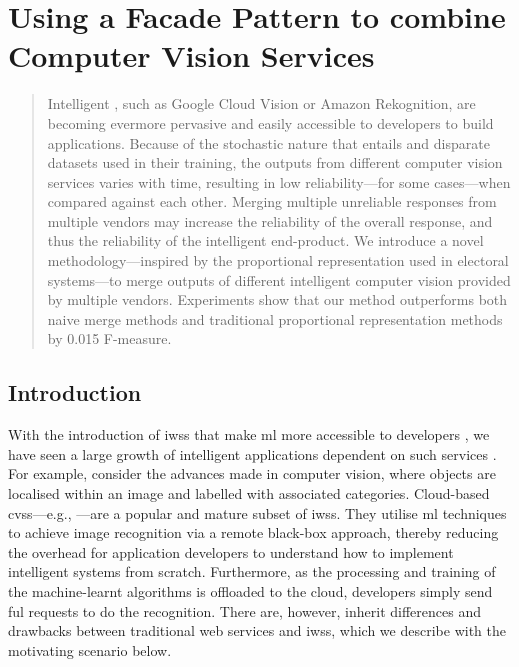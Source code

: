 \chapter[Using a Facade Pattern to combine Computer Vision Services]
{Using a Facade Pattern to combine Computer Vision Services}
\label{ch:icwe2019}
\graphicspath{{mainmatter/publications/figures/icwe2019/}}

\glsresetall
\begin{abstract}
Intelligent , such as Google Cloud Vision or Amazon Rekognition, are becoming evermore pervasive and easily accessible to developers to build applications.
Because of the stochastic nature that  entails and disparate datasets used in their training, the outputs from different computer vision services varies with time, resulting in low reliability---for some cases---when compared against each other.
Merging multiple unreliable  responses from multiple vendors may increase the reliability of the overall response, and thus the reliability of the intelligent end-product.
We introduce a novel methodology---inspired by the proportional representation used in electoral systems---to merge outputs of different intelligent computer vision  provided by multiple vendors.
Experiments show that our method outperforms both naive merge methods and traditional proportional representation methods by 0.015 F-measure.
\end{abstract}
\glsresetall

\section{Introduction}

With the introduction of \glspl{iws} that make \gls{ml} more accessible to developers \citep{Ribeiro:2015dz,Hwang:2017tr}, we have seen a large growth of intelligent applications dependent on such services \citep{Mapillar97:online,FileShad33:online}.
For example, consider the advances made in computer vision, where objects are localised within an image and labelled with associated categories.
Cloud-based \glspl{cvs}---e.g., ---are a popular and mature subset of \glspl{iws}. They utilise \gls{ml} techniques to achieve image recognition via a remote black-box approach, thereby reducing the overhead for application developers to understand how to implement intelligent systems from scratch. Furthermore, as the processing and training of the machine-learnt algorithms is offloaded to the cloud, developers simply send ful  requests to do the recognition. There are, however, inherit differences and drawbacks between traditional web services and \glspl{iws}, which we describe with the motivating scenario below.

